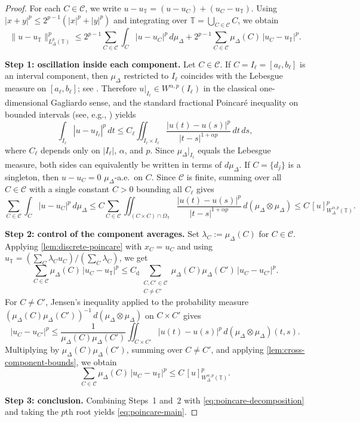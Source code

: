 \documentclass[11pt,a4paper]{article}
\numberwithin{equation}{section}
\theoremstyle{definition}
\newcommand{\T}{\mathbb{T}}
\begin{document}
\begin{proof}
For each $C\in\mathcal C$, we write
$u-u_{\T}=(u-u_C)+(u_C-u_{\T})$. Using
$|x+y|^p\le 2^{p-1}(|x|^p+|y|^p)$ and integrating over
$\T=\bigcup_{C\in\mathcal C} C$, we obtain
\begin{equation}\label{eq:poincare-decomposition}
\|u-u_{\T}\|_{L_\Delta^p(\T)}^p
\le
2^{p-1}\sum_{C\in\mathcal C}\int_C |u-u_C|^p\,d\mu_\Delta
+
2^{p-1}\sum_{C\in\mathcal C}\mu_\Delta(C)\,|u_C-u_{\T}|^p.
\end{equation}

\medskip
\noindent
\textbf{Step 1: oscillation inside each component.}
Let $C\in\mathcal C$. If $C=I_\ell=[a_\ell,b_\ell]$ is an interval
component, then $\mu_\Delta$ restricted to $I_\ell$ coincides with the
Lebesgue measure on $[a_\ell,b_\ell]$; see
\cite[Theorem~5.2]{CabadaVivero2006}. Therefore
$u|_{I_\ell}\in W^{\alpha,p}(I_\ell)$ in the classical one-dimensional
Gagliardo sense, and the standard fractional Poincar\'e inequality on
bounded intervals (see, e.g.,
\cite[Theorem~6.7]{DiNezzaPalatucciValdinoci2012}) yields
\[
\int_{I_\ell}|u-u_{I_\ell}|^p\,dt
\le
C_\ell
\iint_{I_\ell\times I_\ell}
\frac{|u(t)-u(s)|^p}{|t-s|^{1+\alpha p}}\,dt\,ds,
\]
where $C_\ell$ depends only on $|I_\ell|$, $\alpha$, and $p$. Since
$\mu_\Delta|_{I_\ell}$ equals the Lebesgue measure, both sides can
equivalently be written in terms of $d\mu_\Delta$. If $C=\{d_j\}$ is a
singleton, then $u-u_C=0$ $\mu_\Delta$-a.e.\ on $C$. Since $\mathcal C$
is finite, summing over all $C\in\mathcal C$ with a single constant $C>0$
bounding all $C_\ell$ gives
\[
\sum_{C\in\mathcal C}\int_C |u-u_C|^p\,d\mu_\Delta
\le
C\sum_{C\in\mathcal C}
\iint_{(C\times C)\cap\Omega_{\T}}
\frac{|u(t)-u(s)|^p}{|t-s|^{1+\alpha p}}
\,d(\mu_\Delta\otimes\mu_\Delta)
\le
C\,[u]_{W_\Delta^{\alpha,p}(\T)}^p.
\]

\medskip
\noindent
\textbf{Step 2: control of the component averages.}
Set $\lambda_C:=\mu_\Delta(C)$ for $C\in\mathcal C$. Applying \cref{lem:discrete-poincare} with $x_C=u_C$ and using
$u_{\T}=(\sum_C \lambda_C u_C)/(\sum_C \lambda_C)$, we get
\[
\sum_{C\in\mathcal C}\mu_\Delta(C)\,|u_C-u_{\T}|^p
\le
C_{\mathrm d}\sum_{\substack{C,C'\in\mathcal C\\ C\neq C'}}
\mu_\Delta(C)\mu_\Delta(C')\,|u_C-u_{C'}|^p.
\]
For $C\neq C'$, Jensen's inequality applied to the probability measure
$(\mu_\Delta(C)\mu_\Delta(C'))^{-1}\,d(\mu_\Delta\otimes\mu_\Delta)$ on
$C\times C'$ gives
\[
|u_C-u_{C'}|^p
\le
\frac1{\mu_\Delta(C)\mu_\Delta(C')}
\iint_{C\times C'}|u(t)-u(s)|^p\,d(\mu_\Delta\otimes\mu_\Delta)(t,s).
\]
Multiplying by $\mu_\Delta(C)\mu_\Delta(C')$, summing over $C\neq C'$,
and applying \cref{lem:cross-component-bounds}, we obtain
\[
\sum_{C\in\mathcal C}\mu_\Delta(C)\,|u_C-u_{\T}|^p
\le
C\,[u]_{W_\Delta^{\alpha,p}(\T)}^p.
\]

\medskip
\noindent
\textbf{Step 3: conclusion.}
Combining Steps~1 and~2 with \eqref{eq:poincare-decomposition} and taking
the $p$th root yields \eqref{eq:poincare-main}.
\end{proof}
\end{document}
